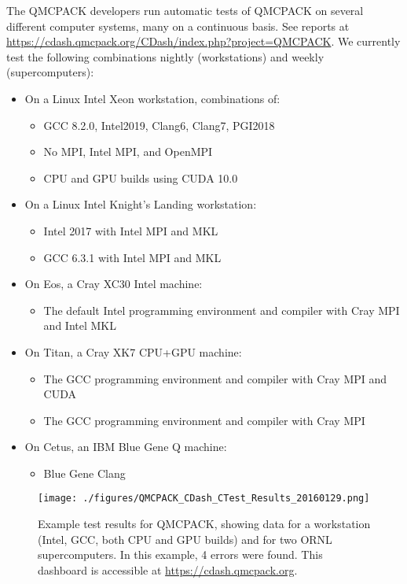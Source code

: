 The QMCPACK developers run automatic tests of QMCPACK on several
different computer systems,  many on a continuous basis. See reports at
\url{https://cdash.qmcpack.org/CDash/index.php?project=QMCPACK}.
We currently test
the following combinations nightly (workstations) and weekly (supercomputers):

\begin{itemize}
\item On a Linux Intel Xeon workstation, combinations of:
  \begin{itemize}
  \item GCC 8.2.0, Intel2019, Clang6, Clang7, PGI2018
  \item No MPI, Intel MPI, and OpenMPI
  \item CPU and GPU builds using CUDA 10.0
  \end{itemize}
\item On a Linux Intel Knight's Landing workstation:
  \begin{itemize}
  \item Intel 2017 with Intel MPI and MKL
  \item GCC 6.3.1 with Intel MPI and MKL
  \end{itemize}
\item On Eos, a Cray XC30 Intel machine:
  \begin{itemize}
\item The default Intel programming environment and compiler with Cray MPI and Intel MKL
  \end{itemize}
\item On Titan, a Cray XK7 CPU+GPU machine:
  \begin{itemize}
  \item The GCC programming environment and compiler with Cray MPI and CUDA
  \item The GCC programming environment and compiler with Cray MPI
  \end{itemize}
\item On Cetus, an IBM Blue Gene Q machine:
\begin{itemize}
\item Blue Gene Clang
\end{itemize}
\end{itemize}

\begin{figure}
  \centering
  \texttt{[image: ./figures/QMCPACK\_CDash\_CTest\_Results\_20160129.png]}
  \caption{Example test results for QMCPACK, showing data for a
    workstation (Intel, GCC, both CPU and GPU builds) and for two ORNL
    supercomputers. In this example, 4 errors were found. This
    dashboard is accessible at \url{https://cdash.qmcpack.org}.}
\end{figure}

